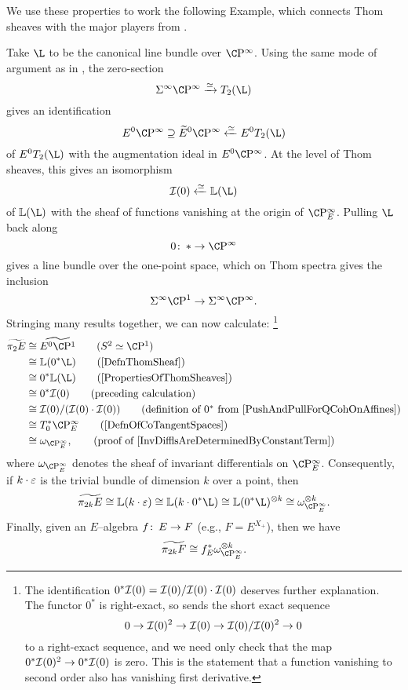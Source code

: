We use these properties to work the following Example, which connects Thom sheaves with the major players from .

\begin{example}\label{Pi2AndInvariantDiffls}
Take \(\L\) to be the canonical line bundle over \(\CP^\infty\).  Using the same mode of argument as in , the zero-section \[\Susp^\infty \CP^\infty \xrightarrow{\simeq} T_2(\L)\] gives an identification \[E^0 \CP^\infty \supseteq \widetilde E^0 \CP^\infty \xleftarrow{\simeq} E^0 T_2(\L)\] of \(E^0 T_2(\L)\) with the augmentation ideal in \(E^0 \CP^\infty\).  At the level of Thom sheaves, this gives an isomorphism \[\sheaf I(0) \xleftarrow{\simeq} \ThomSheaf{\L}\] of \(\ThomSheaf{\L}\) with the sheaf of functions vanishing at the origin of \(\CP^\infty_E\).  Pulling \(\L\) back along \[0\co * \to \CP^\infty\] gives a line bundle over the one-point space, which on Thom spectra gives the inclusion \[\Susp^\infty \CP^1 \to \Susp^\infty \CP^\infty.\]  Stringing many results together, we can now calculate:%
\footnote{The identification \(0^* \mathcal{I}(0) = \mathcal{I}(0) / \mathcal{I}(0) \cdot \mathcal{I}(0)\) deserves further explanation.  The functor \(0^*\) is right-exact, so sends the short exact sequence \[0 \to \mathcal{I}(0)^2 \to \mathcal{I}(0) \to \mathcal{I}(0) / \mathcal{I}(0)^2 \to 0\] to a right-exact sequence, and we need only check that the map \(0^* \mathcal{I}(0)^2 \to 0^* \mathcal{I}(0)\) is zero.  This is the statement that a function vanishing to second order also has vanishing first derivative.}
\begin{align*}
\widetilde{\pi_2 E} & \cong \widetilde{E^0 \CP^1} \tag{\(S^2 \simeq \CP^1\)} \\
& \cong \ThomSheaf{0^* \L} \tag{\Cref{DefnThomSheaf}} \\
& \cong 0^* \ThomSheaf{\L} \tag{\Cref{PropertiesOfThomSheaves}} \\
& \cong 0^* \sheaf I(0) \tag{preceding calculation} \\
& \cong \sheaf I(0) / (\sheaf I(0) \cdot \sheaf I(0)) \tag{definition of \(0^*\) from \Cref{PushAndPullForQCohOnAffines}} \\
& \cong T^*_0 \CP^\infty_E \tag{\Cref{DefnOfCoTangentSpaces}} \\
& \cong \omega_{\CP^\infty_E}, \tag{proof of \Cref{InvDifflsAreDeterminedByConstantTerm}}
\end{align*}
where \(\omega_{\CP^\infty_E}\) denotes the sheaf of invariant differentials on \(\CP^\infty_E\).  Consequently, if \(k \cdot \varepsilon\) is the trivial bundle of dimension \(k\) over a point, then \[\widetilde{\pi_{2k} E} \cong \ThomSheaf{k \cdot \eps} \cong \ThomSheaf{k \cdot 0^* \L} \cong \ThomSheaf{0^* \L}^{\otimes k} \cong \omega_{\CP^\infty_E}^{\otimes k}.\]  Finally, given an \(E\)--algebra \(f \colon\thinspace E \to F\) (e.g., \(F = E^{X_+}\)), then we have \[\widetilde{\pi_{2k} F} \cong f_E^* \omega_{\CP^\infty_E}^{\otimes k}.\]
\end{example}

